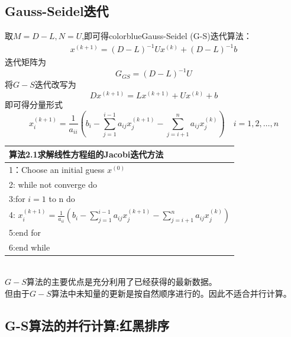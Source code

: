 \documentclass[12pt,a4paper]{article}
\begin{document}
\subsection{Gauss-Seidel迭代}
取$M=D-L,N=U$,即可得{color{blue}Gauss-Seidel (G-S)迭代}算法：
\begin{align}
x^{(k+1)}=(D-L)^{-1} U x^{(k)}+(D-L)^{-1} b\tag{6.9}
\end{align}
迭代矩阵为
$$
G_{GS}=(D-L)^{-1}U
$$
将$G-S$迭代改写为
$$
Dx^{(k+1)}=Lx^{(k+1)}+Ux^{(k)}+b
$$
即可得分量形式
$$
x_{i}^{(k+1)}=\frac{1}{a_{i i}}\left(b_{i}-\sum_{j=1}^{i-1} a_{i j} x_{j}^{(k+1)}-\sum_{j=i+1}^{n} a_{i j} x_{j}^{(k)}\right) \quad i=1,2, \ldots, n
$$
\begin{tabular}{l}
\hline
{\color{blue}算法2.1}求解线性方程组的Jacobi迭代方法\\
\hline
1：Choose an initial guess $x^{(0)}$\\
2: while not converge do\\
3:\qquad for $i=1$ to n do\\
4:\qquad \qquad
$x_{i}^{(k+1)}=\frac{1}{a_{i i}}\left(b_{i}-\sum_{j=1}^{i-1} a_{i j} x_{j}^{(k+1)}-\sum_{j=i+1}^{n} a_{i j} x_{j}^{(k)}\right)$\\
5:\qquad end for\\
6:end while\\
\hline
\end{tabular}\\
$G-S$算法的主要优点是充分利用了已经获得的最新数据。\\
但由于$G-S$算法中未知量的更新是按自然顺序进行的。因此不适合并行计算。\\
\subsection*{G-S算法的并行计算:红黑排序}
\end{document}
